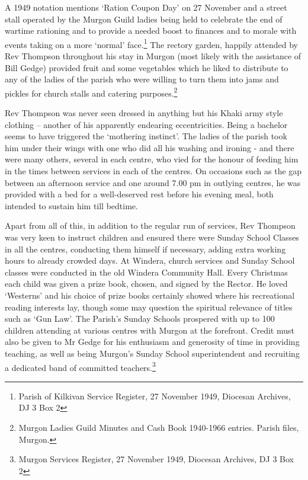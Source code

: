 A 1949 notation mentions `Ration Coupon Day' on 27 November and a street
stall operated by the Murgon Guild ladies being held to celebrate the
end of wartime rationing and to provide a needed boost to finances and
to morale with events taking on a more `normal' face.\footnote{Parish of
  Kilkivan Service Register, 27 November 1949, Diocesan Archives, DJ 3
  Box 2} The rectory garden, happily attended by Rev Thompson throughout
his stay in Murgon (most likely with the assistance of Bill Gedge)
provided fruit and some vegetables which he liked to distribute to any
of the ladies of the parish who were willing to turn them into jams and
pickles for church stalls and catering purposes.\footnote{Murgon Ladies
  Guild Minutes and Cash Book 1940-1966 entries. Parish files, Murgon.}

Rev Thompson was never seen dressed in anything but his Khaki army style
clothing -- another of his apparently endearing eccentricities. Being a
bachelor seems to have triggered the `mothering instinct'. The ladies of
the parish took him under their wings with one who did all his washing
and ironing - and there were many others, several in each centre, who
vied for the honour of feeding him in the times between services in each
of the centres. On occasions such as the gap between an afternoon
service and one around 7.00 pm in outlying centres, he was provided with
a bed for a well-deserved rest before his evening meal, both intended to
sustain him till bedtime.

Apart from all of this, in addition to the regular run of services, Rev
Thompson was very keen to instruct children and ensured there were
Sunday School Classes in all the centres, conducting them himself if
necessary, adding extra working hours to already crowded days. At
Windera, church services and Sunday School classes were conducted in the
old Windera Community Hall. Every Christmas each child was given a prize
book, chosen, and signed by the Rector. He loved `Westerns' and his
choice of prize books certainly showed where his recreational reading
interests lay, though some may question the spiritual relevance of
titles such as `Gun Law'. The Parish's Sunday Schools prospered with up
to 100 children attending at various centres with Murgon at the
forefront. Credit must also be given to Mr Gedge for his enthusiasm and
generosity of time in providing teaching, as well as being Murgon's
Sunday School superintendent and recruiting a dedicated band of
committed teachers.\footnote{Murgon Services Register, 27 November 1949,
  Diocesan Archives, DJ 3 Box 2}

